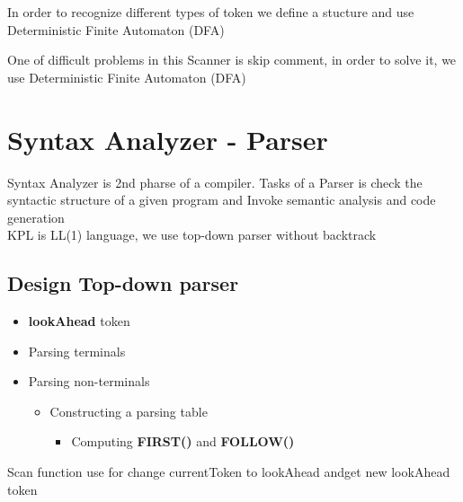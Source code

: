 \documentclass[12pt, a4paper]{article}
\begin{document}
In order to recognize different types of token we define a stucture and use Deterministic Finite Automaton (DFA)\\



\clearpage

One of difficult problems in this Scanner is skip comment, in order to solve it, we use Deterministic Finite Automaton (DFA)\\






\clearpage

\section{Syntax Analyzer - Parser}
Syntax Analyzer is 2nd pharse of a compiler. Tasks of a Parser is check the syntactic structure of a given program and Invoke semantic analysis and code generation\\
KPL is LL(1) language, we use top-down parser without backtrack\\
\subsection*{Design Top-down parser}
\begin{itemize}
	\item \textbf{lookAhead} token
	\item Parsing terminals
	\item Parsing non-terminals
		\begin{itemize}
			\item Constructing a parsing table
			\begin{itemize}
				\item Computing \textbf{FIRST()} and \textbf{FOLLOW()}	
			\end{itemize}		
		\end{itemize}
\end{itemize}




Scan function use for change currentToken to lookAhead andget new lookAhead token\\

\end{document}
